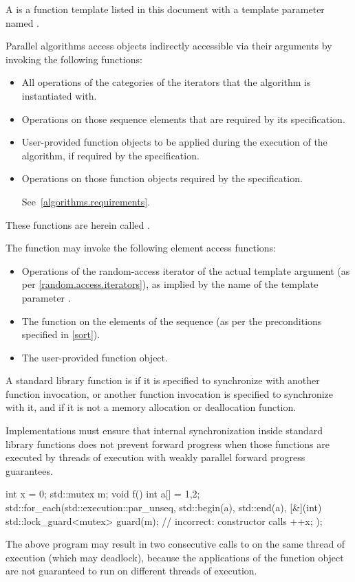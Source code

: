 \pnum
A  is a function template listed in this document
with a template parameter named .

\pnum
Parallel algorithms access objects indirectly accessible via their arguments
by invoking the following functions:
\begin{itemize}
\item
  All operations of the categories of the iterators
  that the algorithm is instantiated with.
\item
  Operations on those sequence elements that are required by its specification.
\item
  User-provided function objects
  to be applied during the execution of the algorithm,
  if required by the specification.
\item
  Operations on those function objects required by the specification.
\begin{note}
See~\ref{algorithms.requirements}.
\end{note}
\end{itemize}
These functions are herein called .
\begin{example}
The  function may invoke the following element access functions:
\begin{itemize}
\item
  Operations of the random-access iterator of the actual template argument
  (as per \ref{random.access.iterators}),
  as implied by the name of the template parameter .
\item
  The  function on the elements of the sequence
  (as per the preconditions specified in \ref{sort}).
\item
  The user-provided  function object.
\end{itemize}
\end{example}

\pnum
A standard library function is 
if it is specified to synchronize with another function invocation, or
another function invocation is specified to synchronize with it,
and if it is not a memory allocation or deallocation function.
\begin{note}
Implementations must ensure that internal synchronization
inside standard library functions does not prevent forward progress
when those functions are executed by threads of execution
with weakly parallel forward progress guarantees.
\end{note}
\begin{example}
\begin{codeblock}
int x = 0;
std::mutex m;
void f() {
  int a[] = {1,2};
  std::for_each(std::execution::par_unseq, std::begin(a), std::end(a), [&](int) {
    std::lock_guard<mutex> guard(m);            // incorrect:  constructor calls 
  ++x;
  });
}
\end{codeblock}
The above program may result in two consecutive calls to 
on the same thread of execution (which may deadlock),
because the applications of the function object are not guaranteed
to run on different threads of execution.
\end{example}

